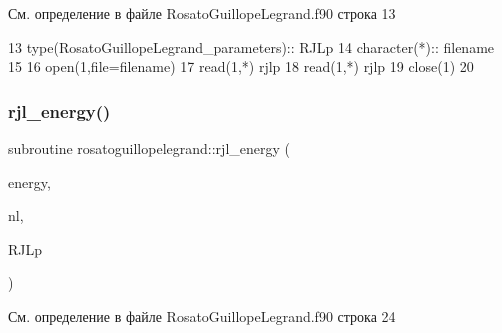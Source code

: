 См. определение в файле Rosato\+Guillope\+Legrand.\+f90 строка 13


\begin{DoxyCode}
13     \textcolor{keywordtype}{type}(RosatoGuillopeLegrand\_parameters):: RJLp
14     \textcolor{keywordtype}{character(*)}::  filename
15     
16     \textcolor{keyword}{open}(1,file=filename)
17     \textcolor{keyword}{read}(1,*) rjlp%
18     \textcolor{keyword}{read}(1,*) rjlp%
19     \textcolor{keyword}{close}(1)
20     
\end{DoxyCode}
\mbox{\label{namespacerosatoguillopelegrand_a06b6c23e50e301e053ed9ccb60e1ca34}} 
\subsubsection{\texorpdfstring{rjl\+\_\+energy()}{rjl\_energy()}}
{\footnotesize\ttfamily subroutine rosatoguillopelegrand\+::rjl\+\_\+energy (\begin{DoxyParamCaption}\item[{real}]{energy,  }\item[{type(\mbox{\hyperlink{structmd__general_1_1neighbour__list}{neighbour\+\_\+list}})}]{nl,  }\item[{type(\mbox{\hyperlink{structrosatoguillopelegrand_1_1rosatoguillopelegrand__parameters}{rosatoguillopelegrand\+\_\+parameters}})}]{R\+J\+Lp }\end{DoxyParamCaption})}



См. определение в файле Rosato\+Guillope\+Legrand.\+f90 строка 24


